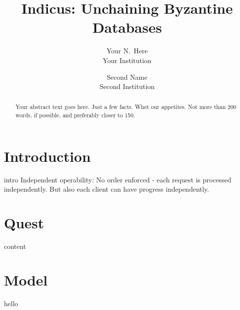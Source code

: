 \documentclass[letterpaper,twocolumn,10pt]{article}
\begin{document}

\date{}

\title{\Large \bf Indicus: Unchaining Byzantine Databases\\
 }

\author{
{\rm Your N.\ Here}\\
Your Institution
\and
{\rm Second Name}\\
Second Institution
} %

\maketitle

\begin{abstract}
Your abstract text goes here. Just a few facts. Whet our appetites.
Not more than 200 words, if possible, and preferably closer to 150.
\end{abstract}


\section{Introduction} 
intro
\newpage
Independent operability: No order enforced - each request is processed independently. But also each client can have progress independently.
\newpage
\section{Quest} 
\newpage
content
\newpage
\section{Model} 
hello
\newpage
\end{document}
